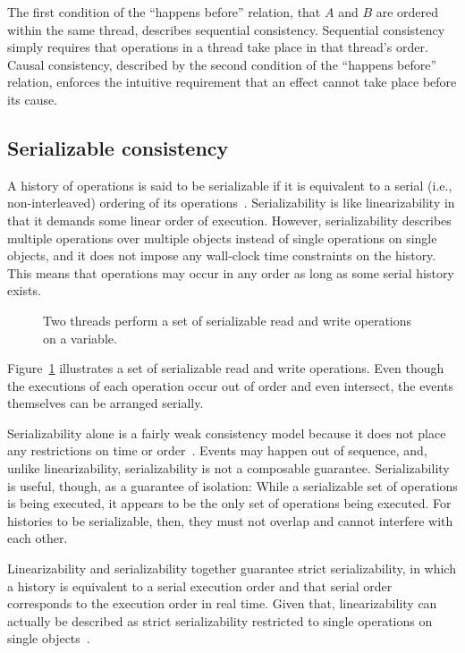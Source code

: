 \documentclass{sig-alternate}
\begin{document}
The first condition of the ``happens before'' relation, that $A$ and $B$ are ordered within the same thread, describes sequential consistency. Sequential consistency simply requires that operations in a thread take place in that thread's order. Causal consistency, described by the second condition of the ``happens before'' relation, enforces the intuitive requirement that an effect cannot take place before its cause.

\subsection{Serializable consistency}

A history of operations is said to be serializable if it is equivalent to a serial (i.e., non-interleaved) ordering of its operations~\cite{Herlihy1990}. Serializability is like linearizability in that it demands some linear order of execution. However, serializability describes multiple operations over multiple objects instead of single operations on single objects, and it does not impose any wall-clock time constraints on the history. This means that operations may occur in any order as long as some serial history exists.

\begin{figure}[ht]
  \centering
  \resizebox{0.76\linewidth}{!}{}
  \caption{Two threads perform a set of serializable read and write operations on a variable.}
\label{figure:serializability}
\end{figure}

Figure~\ref{figure:serializability} illustrates a set of serializable read and write operations. Even though the executions of each operation occur out of order and even intersect, the events themselves can be arranged serially.

Serializability alone is a fairly weak consistency model because it does not place any restrictions on time or order~\cite{Kingsbury2014}. Events may happen out of sequence, and, unlike linearizability, serializability is not a composable guarantee. Serializability is useful, though, as a guarantee of isolation: While a serializable set of operations is being executed, it appears to be the only set of operations being executed. For histories to be serializable, then, they must not overlap and cannot interfere with each other.

Linearizability and serializability together guarantee strict serializability, in which a history is equivalent to a serial execution order and that serial order corresponds to the execution order in real time. Given that, linearizability can actually be described as strict serializability restricted to single operations on single objects~\cite{Herlihy1990}.
\end{document}
